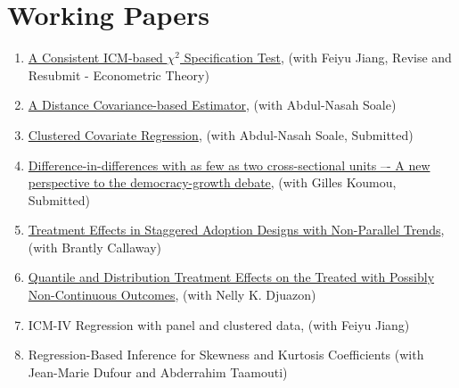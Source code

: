 \documentclass[12pt,letterpaper]{article}
\begin{document}
\section*{Working Papers}
\begin{enumerate}
    \item \href{https://arxiv.org/pdf/2208.13370.pdf}{A Consistent ICM-based $\chi^2$ Specification Test}, (with Feiyu Jiang, Revise and Resubmit - Econometric Theory)
    
    \item \href{https://arxiv.org/pdf/2102.07008.pdf}{A Distance Covariance-based Estimator}, (with Abdul-Nasah Soale)
    
    \item \href{https://arxiv.org/pdf/2302.09255.pdf}{Clustered Covariate Regression}, (with Abdul-Nasah Soale, Submitted)
    
    \item \href{https://arxiv.org/pdf/2408.13047}{Difference-in-differences with as few as two cross-sectional units –- A new perspective to the democracy-growth debate}, (with Gilles Koumou, Submitted)
  
    \item \href{https://arxiv.org/pdf/2308.02899.pdf}{Treatment Effects in Staggered Adoption Designs with Non-Parallel Trends}, (with Brantly Callaway)
  
    \item \href{https://arxiv.org/pdf/2408.07842}{Quantile and Distribution Treatment Effects on the Treated with Possibly Non-Continuous Outcomes}, (with Nelly K. Djuazon)
	
	  \item ICM-IV Regression with panel and clustered data, (with Feiyu Jiang) %

    \item Regression-Based Inference for Skewness and Kurtosis Coefficients (with Jean-Marie Dufour and Abderrahim Taamouti)
	
	
\end{enumerate}
\end{document}
